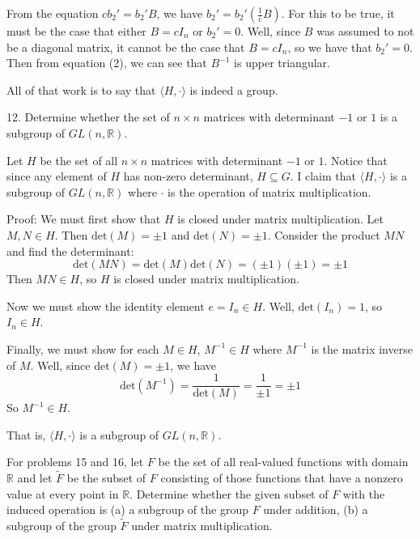\documentclass{article}
\begin{document}
From the equation $cb_2' = b_2'B$, we have $b_2' = b_2'(\frac{1}{c}B)$. For this to be true, it must be the case that either $B = cI_n$ or $b_2' = 0$. Well, since $B$ was assumed to not be a diagonal matrix, it cannot be the case that $B = cI_n$, so we have that $b_2' = 0$. Then from equation (2), we can see that $B^{-1}$ is upper triangular.
\newline

All of that work is to say that $\langle H, \cdot \rangle$ is indeed a group.
\newline\newline

12. Determine whether the set of $n \times n$ matrices with determinant $-1$ or $1$ is a subgroup of $GL(n, \mathbb{R})$.
\newline

Let $H$ be the set of all $n \times n$ matrices with determinant $-1$ or $1$. Notice that since any element of $H$ has non-zero determinant, $H \subseteq G$. I claim that $\langle H, \cdot \rangle$ is a subgroup of $GL(n, \mathbb{R})$ where $\cdot$ is the operation of matrix multiplication. 
\newline

Proof: We must first show that $H$ is closed under matrix multiplication. Let $M, N \in H$. Then $\text{det}(M) = \pm 1$ and $\text{det}(N) = \pm 1$. Consider the product $MN$ and find the determinant:
\[\text{det}(MN) = \text{det}(M)\text{det}(N) = (\pm 1) (\pm 1) = \pm 1\]
Then $MN \in H$, so $H$ is closed under matrix multiplication.

Now we must show the identity element $e = I_n \in H$. Well, $\text{det}(I_n) = 1$, so $I_n \in H$.

Finally, we must show for each $M \in H$, $M^{-1} \in H$ where $M^{-1}$ is the matrix inverse of $M$. Well, since $\text{det}(M) = \pm 1$, we have
\[\text{det}(M^{-1}) = \frac{1}{\text{det}(M)} = \frac{1}{\pm 1} = \pm 1\]
So $M^{-1} \in H$. 

That is, $\langle H, \cdot \rangle$ is a subgroup of $GL(n, \mathbb{R})$.
\newline\newline

For problems 15 and 16, let $F$ be the set of all real-valued functions with domain $\mathbb{R}$ and let $\tilde{F}$ be the subset of $F$ consisting of those functions that have a nonzero value at every point in $\mathbb{R}$. Determine whether the given subset of $F$ with the induced operation is (a) a subgroup of the group $F$ under addition, (b) a subgroup of the group $\tilde{F}$ under matrix multiplication.
\newline
\end{document}
